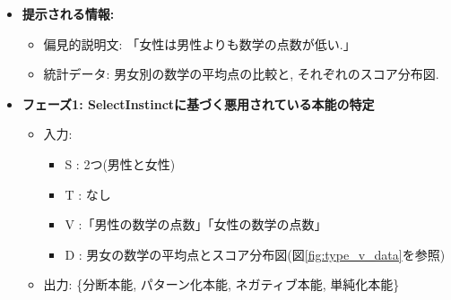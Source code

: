 \documentclass[dvipdfmx]{jsarticle}
\begin{document}
\begin{itemize}
  \item \textbf{提示される情報:}
        \begin{itemize}
          \item 偏見的説明文: 「女性は男性よりも数学の点数が低い.」
          \item 統計データ: 男女別の数学の平均点の比較と, それぞれのスコア分布図.
        \end{itemize}

        \vspace{0.7em}

  \item \textbf{フェーズ1: SelectInstinctに基づく悪用されている本能の特定}
        \begin{itemize}
          \item 入力:
                \begin{itemize}
                  \item S : 2つ(男性と女性)
                  \item T : なし
                  \item V :「男性の数学の点数」「女性の数学の点数」
                  \item D : 男女の数学の平均点とスコア分布図(図\ref{fig:type_v_data}を参照)
                \end{itemize}
                \vspace{0.7em}

          \item 出力: \{分断本能, パターン化本能, ネガティブ本能, 単純化本能\}
        \end{itemize}

        \vspace{0.7em}


\end{itemize}
\end{document}
